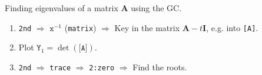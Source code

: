 \documentclass[../Notes.tex]{subfiles}
\begin{document}
\hypertarget{characteristic-polynomial-roots}{}
\begin{GCSkills}{}
    Finding eigenvalues of a matrix \(\mathbf{A}\) using the GC.
    \begin{enumerate}
        \item \texttt{2nd} \(\Longrightarrow\) \(\texttt{x}^{-1}\) (\texttt{matrix}) \(\Longrightarrow\) Key in the matrix \(\mathbf{A}-t\mathbf{I}\), e.g. into \texttt{[A]}. 
        \item Plot \(\texttt{Y}_1=\det{(\texttt{[A]})}\).
        \item \texttt{2nd} \(\Longrightarrow\) \texttt{trace} \(\Longrightarrow\) \texttt{2:zero} \(\Longrightarrow\) Find the roots.
    \end{enumerate}
\end{GCSkills}
    
\end{document}
